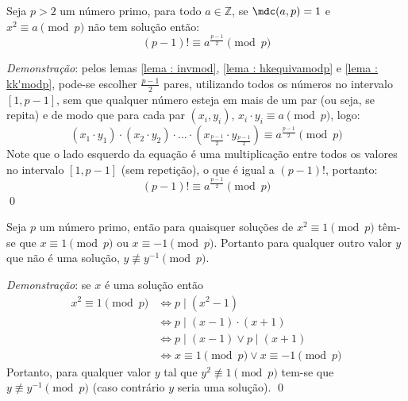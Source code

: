 \begin{lema} \label{lema : modp-1fat}
    Seja $p > 2$ um número primo, para todo $a \in \mathbb{Z}$, se $\mdc(a, p) = 1$ e $x^2 \equiv a \pmod p$ não tem solução então:
    \begin{equation*}
        (p - 1)! \equiv a^{\frac{p-1}{2}} \pmod{p}
    \end{equation*}
    
\end{lema}
\noindent
\textit{Demonstração}: pelos lemas \ref{lema : invmod}, \ref{lema : hkequivamodp} e \ref{lema : kk'modp}, pode-se escolher $\frac{p-1}{2}$ pares, utilizando todos os números no intervalo $[1, p-1]$, sem que qualquer número esteja em mais de um par (ou seja, se repita) e de modo que para cada par $(x_i, y_i)$, $x_i \cdot y_i \equiv a \pmod p$, logo:
    \begin{equation*}
        (x_1 \cdot y_1) \cdot (x_2 \cdot y_2) \cdot ... \cdot \left(x_{\frac{p-1}{2}} \cdot y_{\frac{p-1}{2}}\right) \equiv a^{\frac{p-1}{2}} \pmod{p}
    \end{equation*}
Note que o lado esquerdo da equação é uma multiplicação entre todos os valores no intervalo $[1, p-1]$ (sem repetição), o que é igual a $(p - 1)!$, portanto:
    \begin{equation*}
        (p - 1)! \equiv a^{\frac{p-1}{2}} \pmod{p}
    \end{equation*}
    \qed

\begin{lema} Seja $p$ um número primo, então para quaisquer soluções de $x^2 \equiv 1 \pmod{p}$ têm-se que $x \equiv 1 \pmod{p}$ ou $x \equiv -1 \pmod{p}$. Portanto para qualquer outro valor $y$ que não é uma solução, $y \not\equiv y^{-1} \pmod{p}$.
\label{lema : eq1modp}
\end{lema}
\noindent
\textit{Demonstração}: se $x$ é uma solução então
    \begin{align*}
        x^2 \equiv 1 \pmod{p} &
        \Longleftrightarrow p \mid (x^2 - 1)
        \\
        &
        \Longleftrightarrow p \mid (x - 1) \cdot (x + 1)
        \\
        &
        \Longleftrightarrow p \mid (x - 1) \lor p \mid (x + 1)
        \\
        &
        \Longleftrightarrow x \equiv 1 \pmod{p} \lor x \equiv -1 \pmod{p}
    \end{align*}
Portanto, para qualquer valor $y$ tal que $y^2 \not\equiv 1 \pmod{p}$ tem-se que $y \not\equiv y^{-1} \pmod{p}$ (caso contrário $y$ seria uma solução). \qed

